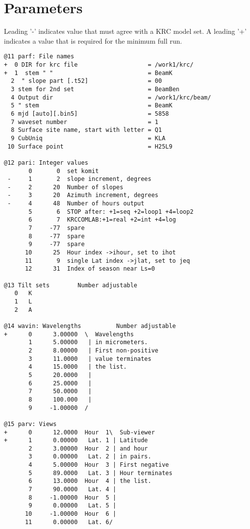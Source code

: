 \documentclass{article}
\begin{document}
\appendix %

\section{Parameters}
Leading '-' indicates value that must agree with a KRC model set. A leading '+' indicates a value that is required for the minimum full run.
\vspace{-3.mm} 
\begin{verbatim}
@11 parf: File names
+  0 DIR for krc file                    = /work1/krc/
+  1  stem " "                           = BeamK
  2  " slope part [.t52]                 = 00
  3 stem for 2nd set                     = BeamBen
  4 Output dir                           = /work1/krc/beam/
  5 " stem                               = BeamK
  6 mjd [auto][.bin5]                    = 5858
  7 waveset number                       = 1
  8 Surface site name, start with letter = Q1
  9 CubUniq                              = KLA
 10 Surface point                        = H25L9

@12 pari: Integer values
       0       0  set komit
 -     1       2  slope increment, degrees
 -     2      20  Number of slopes
 -     3      20  Azimuth increment, degrees
 -     4      48  Number of hours output
       5       6  STOP after: +1=seq +2=loop1 +4=loop2
       6       7  KRCCOMLAB:+1=real +2=int +4=log
       7     -77  spare
       8     -77  spare
       9     -77  spare
      10      25  Hour index ->ihour, set to ihot
      11       9  single Lat index ->jlat, set to jeq
      12      31  Index of season near Ls=0

@13 Tilt sets        Number adjustable
   0   K
   1   L
   2   A

@14 wavin: Wavelengths          Number adjustable
+      0      3.00000  \  Wavelengths
       1      5.00000   | in micrometers.
       2      8.00000   | First non-positive
       3      11.0000   | value terminates
       4      15.0000   | the list.
       5      20.0000   |
       6      25.0000   |
       7      50.0000   |
       8      100.000   |
       9     -1.00000  /

@15 parv: Views                  
+      0      12.0000  Hour  1\  Sub-viewer
+      1      0.00000   Lat. 1 | Latitude
       2      3.00000  Hour  2 | and hour
       3      0.00000   Lat. 2 | in pairs.
       4      5.00000  Hour  3 | First negative
       5      89.0000   Lat. 3 | Hour terminates
       6      13.0000  Hour  4 | the list.
       7      90.0000   Lat. 4 | 
       8     -1.00000  Hour  5 | 
       9      0.00000   Lat. 5 | 
      10     -1.00000  Hour  6 | 
      11      0.00000   Lat. 6/


\end{verbatim}
\end{document}
